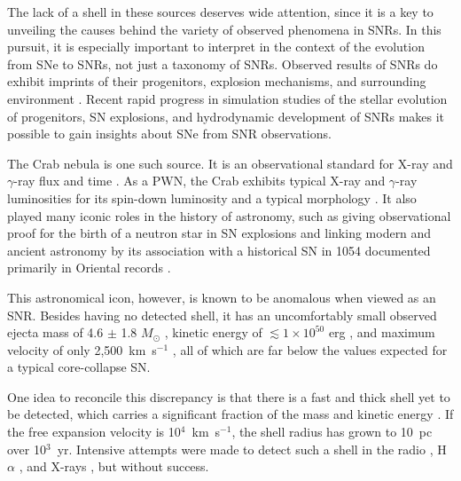 \documentclass[]{pasj01}
\begin{document}
The lack of a shell in these sources deserves wide attention, since it is a key to
unveiling the causes behind the variety of observed phenomena in SNRs. In this pursuit,
it is especially important to interpret in the context of the evolution from SNe to
SNRs, not just a taxonomy of SNRs. Observed results of SNRs do exhibit imprints of their
progenitors, explosion mechanisms, and surrounding environment
\citep{hughes95,yamaguchi14b}. Recent rapid progress in simulation studies of the stellar
evolution of progenitors, SN explosions, and hydrodynamic development of SNRs makes it
possible to gain insights about SNe from SNR observations.

\medskip

The Crab nebula is one such source. It is an observational standard for X-ray and
$\gamma$-ray flux and time
\citep{kirsch05,kaastra09,weisskopf10,madsen15,jahoda06,terada08}. As a PWN, the Crab
exhibits typical X-ray and $\gamma$-ray luminosities for its spin-down luminosity
\citep{possenti02,kargaltsev12,mattana09} and a typical morphology
\citep{ng08,bamba10}. It also played many iconic roles in the history of astronomy, such
as giving observational proof \citep{staelin68,lovelace68} for the birth of a neutron
star in SN explosions \citep{baade34} and linking modern and ancient astronomy by its
association with a historical SN in 1054 documented primarily in Oriental records
\citep{stephenson02,lundmark21,rudie08}.

This astronomical icon, however, is known to be anomalous when viewed as an SNR. Besides
having no detected shell, it has an uncomfortably small observed ejecta mass of 4.6
$\pm$ 1.8 $M_{\odot}$ \citep{fesen97}, kinetic energy of $\lesssim 1 \times 10^{50}$ erg
\citep{davidson85}, and maximum velocity of only 2,500~km~s$^{-1}$ \citep{sollerman00},
all of which are far below the values expected for a typical core-collapse SN.

One idea to reconcile this discrepancy is that there is a fast and thick shell yet to be
detected, which carries a significant fraction of the mass and kinetic energy
\citep{chevalier77}. If the free expansion velocity is 10$^{4}$~km~s$^{-1}$, the shell
radius has grown to 10~pc over 10$^{3}$~yr. Intensive attempts were made to detect such
a shell in the radio \citep{frail95}, H$\alpha$ \citep{tziamtzis09}, and X-rays
\citep{mauche85,predehl95,seward06}, but without success.
\end{document}
